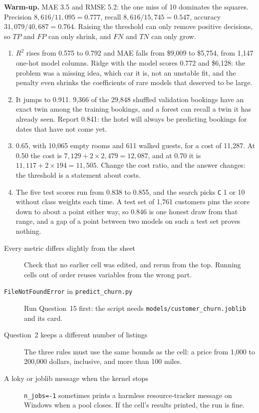 \begin{expectedfindings}
\textbf{Warm-up.} MAE 3.5 and RMSE 5.2: the one miss of 10 dominates the squares. Precision $8{,}616/11{,}095=0.777$, recall $8{,}616/15{,}745=0.547$, accuracy $31{,}079/40{,}687=0.764$. Raising the threshold can only remove positive decisions, so $TP$ and $FP$ can only shrink, and $FN$ and $TN$ can only grow.
\begin{enumerate}
  \item $R^2$ rises from 0.575 to 0.792 and MAE falls from \$9,009 to \$5,754, from 1,147 one-hot model columns. Ridge with the model scores 0.772 and \$6,128: the problem was a missing idea, which car it is, not an unstable fit, and the penalty even shrinks the coefficients of rare models that deserved to be large.
  \item It jumps to 0.911. 9,366 of the 29,848 shuffled validation bookings have an exact twin among the training bookings, and a forest can recall a twin it has already seen. Report 0.841: the hotel will always be predicting bookings for dates that have not come yet.
  \item 0.65, with 10,065 empty rooms and 611 walked guests, for a cost of 11,287. At 0.50 the cost is $7{,}129+2\times2{,}479=12{,}087$, and at 0.70 it is $11{,}117+2\times194=11{,}505$. Change the cost ratio, and the answer changes: the threshold is a statement about costs.
  \item The five test scores run from 0.838 to 0.855, and the search picks \texttt{C} 1 or 10 without class weights each time. A test set of 1,761 customers pins the score down to about a point either way, so 0.846 is one honest draw from that range, and a gap of a point between two models on such a test set proves nothing.
\end{enumerate}
\end{expectedfindings}

\begin{troubleshoot}
\begin{description}
  \item[Every metric differs slightly from the sheet] Check that no earlier cell was edited, and rerun from the top. Running cells out of order reuses variables from the wrong part.
  \item[\texttt{FileNotFoundError} in \texttt{predict\_churn.py}] Run Question~15 first: the script needs \texttt{models/\allowbreak customer\_churn.joblib} and its card.
  \item[Question~2 keeps a different number of listings] The three rules must use the same bounds as the cell: a price from 1,000 to 200,000 dollars, inclusive, and more than 100 miles.
  \item[A loky or joblib message when the kernel stops] \texttt{n\_jobs=-1} sometimes prints a harmless resource-tracker message on Windows when a pool closes. If the cell's results printed, the run is fine.
\end{description}
\end{troubleshoot}

